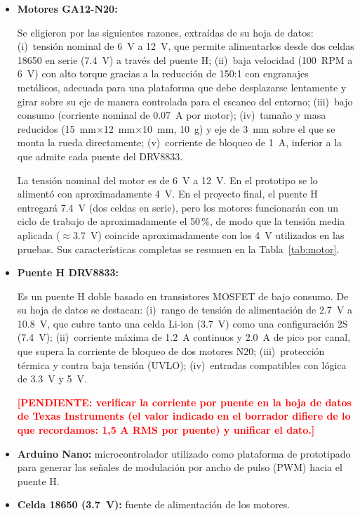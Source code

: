 \documentclass[12pt,a4paper]{article}
\newcommand{\pendiente}[1]{\textcolor{red}{\textbf{[PENDIENTE: #1]}}}
\begin{document}
\begin{itemize}[nosep]
  \item \textbf{Motores GA12-N20:}
  \begin{visar}
  Se eligieron por las siguientes razones, extraídas de su hoja de datos: (i)~tensión nominal de \SI{6}{V} a \SI{12}{V}, que permite alimentarlos desde dos celdas 18650 en serie (\SI{7,4}{V}) a través del puente H; (ii)~baja velocidad (\SI{100}{RPM} a \SI{6}{V}) con alto torque gracias a la reducción de 150:1 con engranajes metálicos, adecuada para una plataforma que debe desplazarse lentamente y girar sobre su eje de manera controlada para el escaneo del entorno; (iii)~bajo consumo (corriente nominal de \SI{0,07}{A} por motor); (iv)~tamaño y masa reducidos (\SI{15}{mm}$\times$\SI{12}{mm}$\times$\SI{10}{mm}, \SI{10}{g}) y eje de \SI{3}{mm} sobre el que se monta la rueda directamente; (v)~corriente de bloqueo de \SI{1}{A}, inferior a la que admite cada puente del DRV8833.
  \end{visar}
  La tensión nominal del motor es de \SI{6}{V} a \SI{12}{V}. En el prototipo se lo alimentó con aproximadamente \SI{4}{V}. En el proyecto final, el puente H entregará \SI{7,4}{V} (dos celdas en serie), pero los motores funcionarán con un ciclo de trabajo de aproximadamente el 50\,\%, de modo que la tensión media aplicada ($\approx$\SI{3,7}{V}) coincide aproximadamente con los \SI{4}{V} utilizados en las pruebas. Sus características completas se resumen en la Tabla~\ref{tab:motor}.

  \item \textbf{Puente H DRV8833:}
  \begin{visar}
  Es un puente H doble basado en transistores MOSFET de bajo consumo. De su hoja de datos se destacan: (i)~rango de tensión de alimentación de \SI{2,7}{V} a \SI{10,8}{V}, que cubre tanto una celda Li-ion (\SI{3,7}{V}) como una configuración 2S (\SI{7,4}{V}); (ii)~corriente máxima de \SI{1,2}{A} continuos y \SI{2,0}{A} de pico por canal, que supera la corriente de bloqueo de dos motores N20; (iii)~protección térmica y contra baja tensión (UVLO); (iv)~entradas compatibles con lógica de \SI{3,3}{V} y \SI{5}{V}.
  \end{visar}
  \pendiente{verificar la corriente por puente en la hoja de datos de Texas Instruments (el valor indicado en el borrador difiere de lo que recordamos: 1,5 A RMS por puente) y unificar el dato.}

  \item \textbf{Arduino Nano:} microcontrolador utilizado como plataforma de prototipado para generar las señales de modulación por ancho de pulso (PWM) hacia el puente H.
  \item \textbf{Celda 18650 (\SI{3,7}{V}):} fuente de alimentación de los motores.
\end{itemize}
\end{document}
